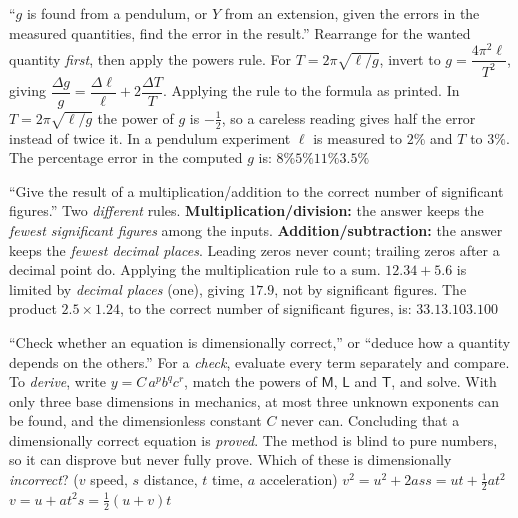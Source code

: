 {``$g$ is found from a pendulum, or $Y$ from an extension, given the errors in the measured quantities,
find the error in the result.''}
{Rearrange for the wanted quantity \emph{first}, then apply the powers rule. For
$T=2\pi\sqrt{\ell/g}$, invert to $g=\dfrac{4\pi^2\ell}{T^2}$, giving
$\dfrac{\Delta g}{g}=\dfrac{\Delta\ell}{\ell}+2\dfrac{\Delta T}{T}$.}
{Applying the rule to the formula as printed. In $T=2\pi\sqrt{\ell/g}$ the power of $g$ is
$-\tfrac12$, so a careless reading gives half the error instead of twice it.}
{In a pendulum experiment $\ell$ is measured to $2\%$ and $T$ to $3\%$. The percentage error in the
computed $g$ is:}
{$8\%$}{$5\%$}{$11\%$}{$3.5\%$}

{``Give the result of a multiplication/addition to the correct number of significant figures.''}
{Two \emph{different} rules. \textbf{Multiplication/division:} the answer keeps the \emph{fewest
significant figures} among the inputs. \textbf{Addition/subtraction:} the answer keeps the \emph{fewest
decimal places}. Leading zeros never count; trailing zeros after a decimal point do.}
{Applying the multiplication rule to a sum. $12.34+5.6$ is limited by \emph{decimal places} (one), giving
$17.9$, not by significant figures.}
{The product $2.5\times1.24$, to the correct number of significant figures, is:}
{$3$}{$3.1$}{$3.10$}{$3.100$}

{``Check whether an equation is dimensionally correct,'' or ``deduce how a quantity depends on the
others.''}
{For a \emph{check}, evaluate every term separately and compare. To \emph{derive}, write
$y=C\,a^{p}b^{q}c^{r}$, match the powers of $\mathsf{M}$, $\mathsf{L}$ and $\mathsf{T}$, and solve.
With only three base dimensions in mechanics, at most three unknown exponents can be found, and the
dimensionless constant $C$ never can.}
{Concluding that a dimensionally correct equation is \emph{proved}. The method is blind to pure numbers,
so it can disprove but never fully prove.}
{Which of these is dimensionally \emph{incorrect}? ($v$ speed, $s$ distance, $t$ time, $a$ acceleration)}
{$v^2=u^2+2as$}{$s=ut+\tfrac12at^2$}{$v=u+at^2$}{$s=\tfrac12(u+v)t$}
